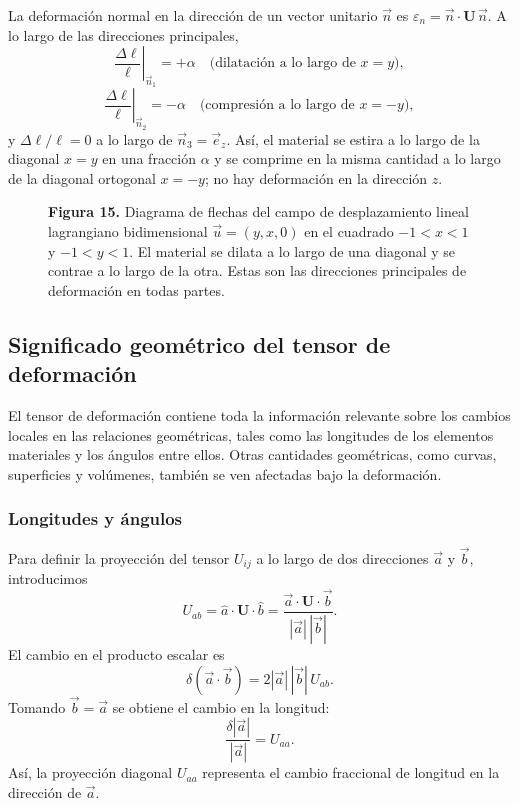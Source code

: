 La deformación normal en la dirección de un vector unitario $\vec{n}$ es $\varepsilon_n = \vec{n}\cdot\mathbf{U}\,\vec{n}$. A lo largo de las direcciones principales,
\[ \left.\frac{\Delta\ell}{\ell}\right|_{\vec{n}_1} = +\alpha \quad \text{(dilatación a lo largo de } x = y\text{)}, \]
\[ \left.\frac{\Delta\ell}{\ell}\right|_{\vec{n}_2} = -\alpha \quad \text{(compresión a lo largo de } x = -y\text{)}, \]
y $\Delta\ell/\ell = 0$ a lo largo de $\vec{n}_3 = \vec{e}_z$. Así, el material se estira a lo largo de la diagonal $x = y$ en una fracción $\alpha$ y se comprime en la misma cantidad a lo largo de la diagonal ortogonal $x = -y$; no hay deformación en la dirección $z$.

\begin{figure}[H]
\centering

\par\medskip
\textbf{Figura 15.} Diagrama de flechas del campo de desplazamiento lineal lagrangiano bidimensional $\vec{u} = (y, x, 0)$ en el cuadrado $-1 < x < 1$ y $-1 < y < 1$. El material se dilata a lo largo de una diagonal y se contrae a lo largo de la otra. Estas son las direcciones principales de deformación en todas partes.
\end{figure}

\subsection{Significado geométrico del tensor de deformación}

El tensor de deformación contiene toda la información relevante sobre los cambios locales en las relaciones geométricas, tales como las longitudes de los elementos materiales y los ángulos entre ellos. Otras cantidades geométricas, como curvas, superficies y volúmenes, también se ven afectadas bajo la deformación.

\subsubsection{Longitudes y ángulos}

Para definir la proyección del tensor $U_{ij}$ a lo largo de dos direcciones $\vec{a}$ y $\vec{b}$, introducimos
\[ U_{ab} = \hat{a}\cdot\mathbf{U}\cdot\hat{b} = \frac{\vec{a}\cdot\mathbf{U}\cdot\vec{b}}{|\vec{a}|\,|\vec{b}|}. \]
El cambio en el producto escalar es
\[ \delta(\vec{a}\cdot\vec{b}) = 2|\vec{a}|\,|\vec{b}|\,U_{ab}. \]
Tomando $\vec{b} = \vec{a}$ se obtiene el cambio en la longitud:
\[ \frac{\delta|\vec{a}|}{|\vec{a}|} = U_{aa}. \]
Así, la proyección diagonal $U_{aa}$ representa el cambio fraccional de longitud en la dirección de $\vec{a}$.

